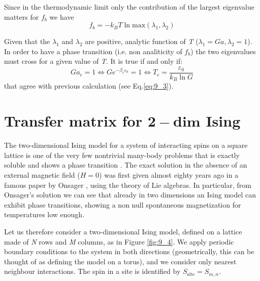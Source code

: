 \documentclass[../../Main/Main.tex]{subfiles}
\begin{document}
Since in the thermodynamic limit only the contribution of the largest eigenvalue matters for \( f_b \) we have
\begin{equation*}
  f_b = - k_B T \ln{\text{max} (\lambda _1, \lambda _2)}
\end{equation*}
\begin{remark}
Given that the \( \lambda _1 \) and \( \lambda _2 \) are positive, analytic function of \emph{T} (\( \lambda _1 = Ga, \lambda _2=1 \)). In order to have a phase transition
(i.e. non analiticity of \( f_b \)) the two eigenvalues must cross for a given value of \emph{T}. It is true if and only if:
\begin{equation}
  G a_c =1 \Leftrightarrow G e^{-\beta _c \varepsilon _0} = 1  \Leftrightarrow T_c = \frac{\varepsilon _0}{k_B \ln{G} }
\end{equation}
that agree with previous calculation (see Eq.\eqref{eq:9_3}).
\end{remark}


\section{Transfer matrix for \(\pmb{2-dim}\) Ising}
The two-dimensional Ising model for a system of interacting spins on a square lattice is one of the very few nontrivial many-body problems that is exactly soluble and shows a phase transition \cite{9_lesson_2}. 
The exact solution in the absence of an external magnetic field (\(H=0\)) was first given almost eighty years ago in a famous paper by Onsager \cite{9_lesson_1}, using the theory of Lie algebras. In particular, from Onsager's solution we can see that already in two dimensions an Ising model can exhibit phase transitions, showing a non null spontaneous magnetization for temperatures low enough.


Let us therefore consider a two-dimensional Ising model, defined on a lattice made of \emph{N} rows and \emph{M} columns, as in Figure \ref{fig:9_4}. We apply periodic boundary conditions to the system in both directions (geometrically, this can be thought of as defining the model on a torus), and we  consider only nearest neighbour interactions.
The spin in a site is identified by \( S_{\text{site}} = S_{m,n} \).
\end{document}
